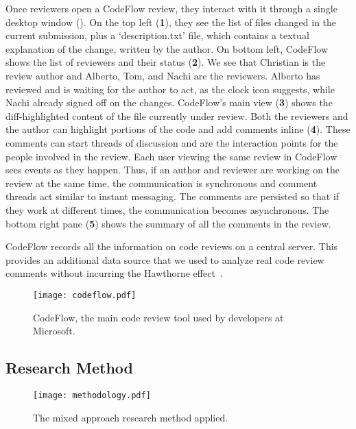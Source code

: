 Once reviewers open a CodeFlow review, they interact with it through a single
desktop window (). On the top left (\textbf{1}), they see the list of files
changed in the current submission, plus a `description.txt' file, which
contains a textual explanation of the change, written by the author. On bottom
left, CodeFlow shows the list of reviewers and their status (\textbf{2}). We see that
Christian is the review author and Alberto, Tom, and Nachi are the reviewers.
Alberto has reviewed and is waiting for the author to act, as the clock icon
suggests, while Nachi already signed off on the changes. CodeFlow's main view
(\textbf{3}) shows the diff-highlighted content of the file currently under review. Both
the reviewers and the author can highlight portions of the code and add
comments inline (\textbf{4}). These comments can start threads of discussion and are the
interaction points for the people involved in the review. Each user viewing the
same review in CodeFlow sees events as they happen.  Thus, if an author and
reviewer are working on the review at the same time, the communication is
synchronous and comment threads act similar to instant messaging. The comments
are persisted so that if they work at different times, the communication
becomes asynchronous. The bottom right pane (\textbf{5}) shows the summary of all the
comments in the review. 

CodeFlow records all the information on code reviews on a
central server. This provides an additional data source that we used to analyze
real code review comments without incurring the Hawthorne effect~\cite{adair1984hawthorne}.



\begin{figure}[t] %
   \centering
   \texttt{[image: codeflow.pdf]}
   \caption{CodeFlow, the main code review tool used by developers at Microsoft.}
   \label{fig:codeflow:screenshot}
\end{figure}



\subsection{Research Method}

\begin{figure*}[t] %
   \centering
   \texttt{[image: methodology.pdf]}
   \caption{The mixed approach research method applied.}
   \label{fig:research-method}
   \vspace{-1.5em}
\end{figure*}

